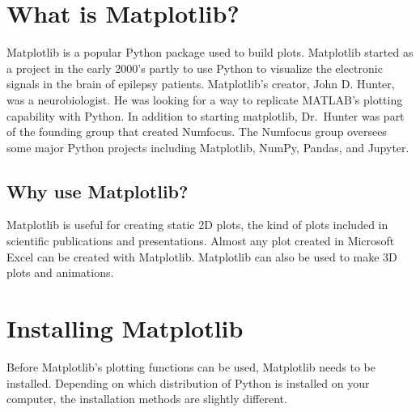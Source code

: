 \documentclass{book}
\begin{document}
    




    
        \hypertarget{what-is-matplotlib}{%
\section{What is Matplotlib?}\label{what-is-matplotlib}}
    




    
        Matplotlib is a popular Python package used to build plots. Matplotlib
started as a project in the early 2000's partly to use Python to
visualize the electronic signals in the brain of epilepsy patients.
Matplotlib's creator, John D. Hunter, was a neurobiologist. He was
looking for a way to replicate MATLAB's plotting capability with Python.
In addition to starting matplotlib, Dr.~Hunter was part of the founding
group that created Numfocus. The Numfocus group oversees some major
Python projects including Matplotlib, NumPy, Pandas, and Jupyter.
    




    
        \hypertarget{why-use-matplotlib}{%
\subsection{Why use Matplotlib?}\label{why-use-matplotlib}}
    




    
        Matplotlib is useful for creating static 2D plots, the kind of plots
included in scientific publications and presentations. Almost any plot
created in Microsoft Excel can be created with Matplotlib. Matplotlib
can also be used to make 3D plots and animations.
    




    
        \hypertarget{installing-matplotlib}{%
\section{Installing Matplotlib}\label{installing-matplotlib}}
    




    
        Before Matplotlib's plotting functions can be used, Matplotlib needs to
be installed. Depending on which distribution of Python is installed on
your computer, the installation methods are slightly different.
    
\end{document}
